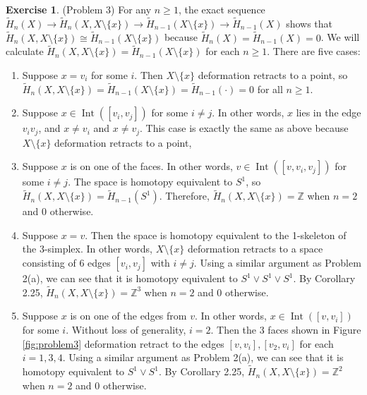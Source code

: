 \documentclass[12pt, psamsfonts]{amsart}
\theoremstyle{definition}
\newtheorem*{exer}{Exercise}
\theoremstyle{remark}
\DeclareMathOperator{\Int}{Int}
\numberwithin{equation}{section}
\begin{document}
\begin{exer}{(Problem 3)}
  For any $n \geq 1$, the exact sequence $\tilde{H}_n(X) \rightarrow \tilde{H}_n(X, X \setminus \{ x \}) \rightarrow \tilde{H}_{n - 1}(X \setminus \{ x \}) \rightarrow \tilde{H}_{n - 1}(X)$ shows that $\tilde{H}_n(X, X \setminus \{ x \}) \cong \tilde{H}_{n - 1}(X \setminus \{ x \})$ because $\tilde{H}_n(X) = \tilde{H}_{n - 1}(X) = 0$.
  We will calculate $\tilde{H}_n(X, X \setminus \{ x \}) = \tilde{H}_{n - 1}(X \setminus \{ x \})$ for each $n \geq 1$.
  There are five cases:
  \begin{enumerate}
    \item 
      Suppose $x = v_i$ for some $i$.
      Then $X \setminus \{ x \}$ deformation retracts to a point, so $\tilde{H}_n(X, X \setminus \{ x \}) = \tilde{H}_{n - 1}(X \setminus \{ x \}) = \tilde{H}_{n - 1}(\cdot) = 0$ for all $n \geq 1$.
    \item
      Suppose $x \in \Int([v_i, v_j])$ for some $i \ne j$.
      In other words, $x$ lies in the edge $v_iv_j$, and $x \ne v_i$ and $x \ne v_j$.
      This case is exactly the same as above because $X \setminus \{ x \}$ deformation retracts to a point,
    \item
      Suppose $x$ is on one of the faces.
      In other words, $v \in \Int([v, v_i, v_j])$ for some $i \ne j$.
      The space is homotopy equivalent to $S^1$, so $\tilde{H}_n(X, X \setminus \{ x \}) = \tilde{H}_{n - 1}(S^1)$.
      Therefore, $\tilde{H}_n(X, X \setminus \{ x \}) = \mathbb{Z}$ when $n = 2$ and 0 otherwise.
    \item
      Suppose $x = v$.
      Then the space is homotopy equivalent to the 1-skeleton of the 3-simplex.
      In other words, $X \setminus \{ x \}$ deformation retracts to a space consisting of 6 edges $[v_i, v_j]$ with $i \ne j$.
      Using a similar argument as Problem 2(a), we can see that it is homotopy equivalent to $S^1 \vee S^1 \vee S^1$.
      By Corollary 2.25, $\tilde{H}_n(X, X \setminus \{ x \}) = \mathbb{Z}^3$ when $n = 2$ and 0 otherwise.
    \item
      Suppose $x$ is on one of the edges from $v$.
      In other words, $x \in \Int([v, v_i])$ for some $i$.
      Without loss of generality, $i = 2$.
      Then the 3 faces shown in Figure \ref{fig:problem3} deformation retract to the edges $[v, v_i], [v_2, v_i]$ for each $i = 1, 3, 4$.
      Using a similar argument as Problem 2(a), we can see that it is homotopy equivalent to $S^1 \vee S^1$.
      By Corollary 2.25, $\tilde{H}_n(X, X \setminus \{ x \}) = \mathbb{Z}^2$ when $n = 2$ and 0 otherwise.
  \end{enumerate}
\end{exer}
\end{document}
